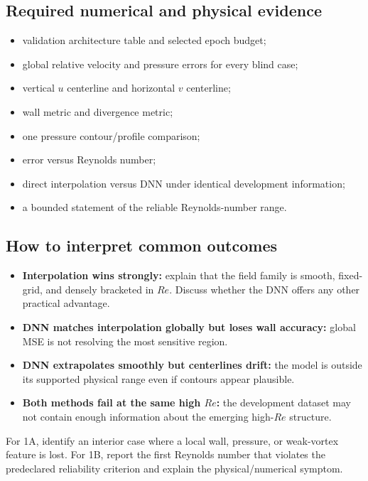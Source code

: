 \documentclass[11pt]{article}
\begin{document}
\subsection{Required numerical and physical evidence}
\begin{itemize}
\item validation architecture table and selected epoch budget;
\item global relative velocity and pressure errors for every blind case;
\item vertical $u$ centerline and horizontal $v$ centerline;
\item wall metric and divergence metric;
\item one pressure contour/profile comparison;
\item error versus Reynolds number;
\item direct interpolation versus DNN under identical development information;
\item a bounded statement of the reliable Reynolds-number range.
\end{itemize}

\subsection{How to interpret common outcomes}
\begin{itemize}
\item \textbf{Interpolation wins strongly:} explain that the field family is smooth, fixed-grid, and densely bracketed in $Re$. Discuss whether the DNN offers any other practical advantage.
\item \textbf{DNN matches interpolation globally but loses wall accuracy:} global MSE is not resolving the most sensitive region.
\item \textbf{DNN extrapolates smoothly but centerlines drift:} the model is outside its supported physical range even if contours appear plausible.
\item \textbf{Both methods fail at the same high $Re$:} the development dataset may not contain enough information about the emerging high-$Re$ structure.
\end{itemize}

\begin{failurebox}
For 1A, identify an interior case where a local wall, pressure, or weak-vortex feature is lost. For 1B, report the first Reynolds number that violates the predeclared reliability criterion and explain the physical/numerical symptom.
\end{failurebox}
\end{document}
